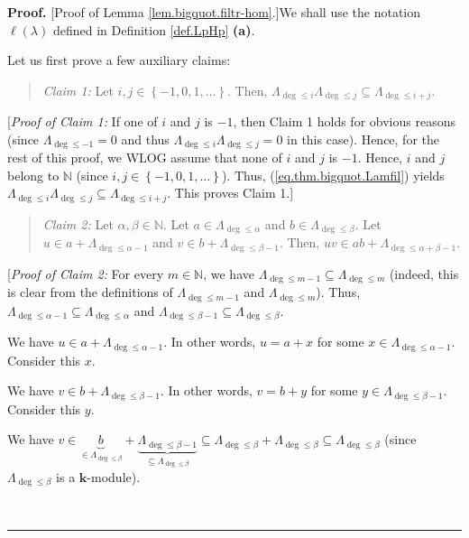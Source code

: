 \documentclass[numbers=enddot,12pt,final,onecolumn,notitlepage]{scrartcl}%
\theoremstyle{definition}
\newenvironment{statement}{\begin{quote}}{\end{quote}}
\newenvironment{proof}[1][Proof]{\noindent\textbf{#1.} }{\ \rule{0.5em}{0.5em}}
\begin{document}
\begin{proof}
[Proof of Lemma \ref{lem.bigquot.filtr-hom}.]We shall use the notation
$\ell\left(  \lambda\right)  $ defined in Definition \ref{def.LpHp}
\textbf{(a)}.

Let us first prove a few auxiliary claims:

\begin{statement}
\textit{Claim 1:} Let $i,j\in\left\{  -1,0,1,\ldots\right\}  $. Then,
$\Lambda_{\deg\leq i}\Lambda_{\deg\leq j}\subseteq\Lambda_{\deg\leq i+j}$.
\end{statement}

[\textit{Proof of Claim 1:} If one of $i$ and $j$ is $-1$, then Claim 1 holds
for obvious reasons (since $\Lambda_{\deg\leq-1}=0$ and thus $\Lambda
_{\deg\leq i}\Lambda_{\deg\leq j}=0$ in this case). Hence, for the rest of
this proof, we WLOG assume that none of $i$ and $j$ is $-1$. Hence, $i$ and
$j$ belong to $\mathbb{N}$ (since $i,j\in\left\{  -1,0,1,\ldots\right\}  $).
Thus, (\ref{eq.thm.bigquot.Lamfil}) yields $\Lambda_{\deg\leq i}\Lambda
_{\deg\leq j}\subseteq\Lambda_{\deg\leq i+j}$. This proves Claim 1.]

\begin{statement}
\textit{Claim 2:} Let $\alpha,\beta\in\mathbb{N}$. Let $a\in\Lambda_{\deg
\leq\alpha}$ and $b\in\Lambda_{\deg\leq\beta}$. Let $u\in a+\Lambda_{\deg
\leq\alpha-1}$ and $v\in b+\Lambda_{\deg\leq\beta-1}$. Then, $uv\in
ab+\Lambda_{\deg\leq\alpha+\beta-1}$.
\end{statement}

[\textit{Proof of Claim 2:} For every $m\in\mathbb{N}$, we have $\Lambda
_{\deg\leq m-1}\subseteq\Lambda_{\deg\leq m}$ (indeed, this is clear from the
definitions of $\Lambda_{\deg\leq m-1}$ and $\Lambda_{\deg\leq m}$). Thus,
$\Lambda_{\deg\leq\alpha-1}\subseteq\Lambda_{\deg\leq\alpha}$ and
$\Lambda_{\deg\leq\beta-1}\subseteq\Lambda_{\deg\leq\beta}$.

We have $u\in a+\Lambda_{\deg\leq\alpha-1}$. In other words, $u=a+x$ for some
$x\in\Lambda_{\deg\leq\alpha-1}$. Consider this $x$.

We have $v\in b+\Lambda_{\deg\leq\beta-1}$. In other words, $v=b+y$ for some
$y\in\Lambda_{\deg\leq\beta-1}$. Consider this $y$.

We have $v\in\underbrace{b}_{\in\Lambda_{\deg\leq\beta}}+\underbrace{\Lambda
_{\deg\leq\beta-1}}_{\subseteq\Lambda_{\deg\leq\beta}}\subseteq\Lambda
_{\deg\leq\beta}+\Lambda_{\deg\leq\beta}\subseteq\Lambda_{\deg\leq\beta}$
(since $\Lambda_{\deg\leq\beta}$ is a $\mathbf{k}$-module).


\end{proof}
\end{document}
